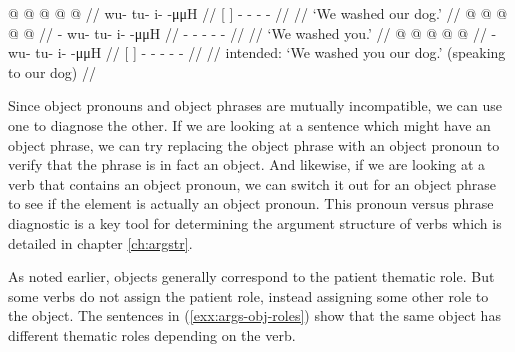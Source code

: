 \pex\label{exx:args-obj-notboth}%
\a\label{ex:args-obj-notboth-phrase}%
%
\begingl
	\gla	{}   @ {} {}  @ {} @ {} @ {} @ {} //
	\glb	{}    {} wu- tu- i-  -μμH //
	\glc	{}[    {}]
			- - -  - //
	\gld	{}   {} {}  {} {} {} {} //
	\glft	‘We washed our dog.’
		//
\endgl
\a\label{ex:args-obj-notboth-pron}%
%
\begingl
	\gla	{} @ {} @ {} @ {} @ {} @ {} //
	\glb	{}- wu- tu- i-  -μμH //
	\glc	{}- - - -  - //
	\gld	{} {} {} {} {} {} //
	\glft	‘We washed you.’
		//
\endgl
\a\label{ex:args-obj-notboth-both}%
\ljudge{*}%
%
\begingl
	\gla	{}   @ {} {}  @ {} @ {} @ {} @ {} //
	\glb	{}    {} - wu- tu- i-  -μμH //
	\glc	{}[    {}]
			- - - -  - //
	\gld	{}   {} {}  {} {} {} {} //
	\glft	intended: ‘We washed you our dog.’ (speaking to our dog)
		//
\endgl
\xe

Since object pronouns and object phrases are mutually incompatible, we can use one to diagnose the other.
If we are looking at a sentence which might have an object phrase, we can try replacing the object phrase with an object pronoun to verify that the phrase is in fact an object.
And likewise, if we are looking at a verb that contains an object pronoun, we can switch it out for an object phrase to see if the element is actually an object pronoun.
This pronoun versus phrase diagnostic is a key tool for determining the argument structure of verbs which is detailed in chapter \ref{ch:argstr}.

As noted earlier, objects generally correspond to the patient thematic role.
But some verbs do not assign the patient role, instead assigning some other role to the object.
The sentences in (\ref{exx:args-obj-roles}) show that the same object has different thematic roles depending on the verb.

